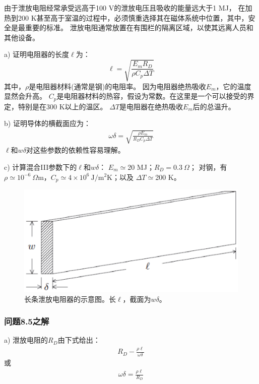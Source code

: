 由于泄放电阻经常承受远高于100 V的泄放电压且吸收的能量远大于1 MJ，
在加热到200 K甚至高于室温的过程中，必须慎重选择其在磁体系统中位置，其中，安全是最重要的标准。
泄放电阻通常放置在有围栏的隔离区域，以使其远离人员和其他设备。

a) 证明电阻器的长度$\ell$为：
\begin{equation}%
\ell=\sqrt{\frac{E_mR_D}{\rho C_p\Delta T}}
\end{equation}
其中，$\rho$是电阻器材料(通常是钢)的电阻率。
因为电阻器绝热吸收$E_m$，它的温度显然会升高。
$C_p$是电阻器材料的热容，假设为常数。在这里是一个可以接受的界定，特别是在300 K以上的温区。
$\Delta T$是电阻器在绝热吸收$E_m$后的总温升。

b) 证明导体的横截面应为：
\begin{align*}%
\omega\delta=\sqrt{\frac{\rho E_m}{R_DC_p\Delta T}} \tag{8.76b}
\end{align*}
$\ell$和$w\delta$对这些参数的依赖性容易理解。

c) 计算混合III参数下的$\ell$和$w\delta$：
$E_m\simeq$20 MJ；$R_D=0.3\ \Omega$；
对钢，有$\rho\simeq10^{-6}\ \Omega$m，$C_p\simeq 4\times 10^6\ \mathrm{J/m^2K}$；以及
$\Delta T\simeq$200 K。
\begin{figure}
	\centering
	\includegraphics[scale=0.6]{chpt8/figs/fig8.22.eps}
	\caption{长条泄放电阻器的示意图。长$\ell$，截面为$w\delta$。}
\end{figure}

\subsubsection{问题8.5之解}
a) 泄放电阻的$R_D$由下式给出：
\begin{align*}%
R_D-\frac{\rho\ell}{\omega\delta} \tag{S5.1a}
\end{align*}
或
\begin{align*}%
\omega\delta=\frac{\rho\ell}{R_D} \tag{S5.1b}
\end{align*}

